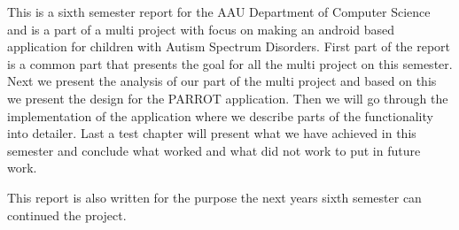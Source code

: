 This is a sixth semester report for the AAU Department of Computer Science and is a part of a multi project with focus on making an android based application for children with Autism Spectrum Disorders. First part of the report is a common part that presents the goal for all the multi project on this semester. Next we present the analysis of our part of the multi project and based on this we present the design for the  PARROT application.
Then we will go through the implementation of the application where we describe parts of the functionality into detailer. 
Last a test chapter will present what we have achieved in this semester and conclude what worked and what did not work to put in future work.

This report is also written for the purpose the next years sixth semester can continued the project.   





